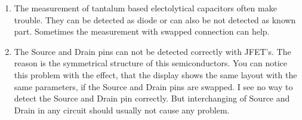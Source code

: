 \begin{enumerate}
\item The measurement of tantalum based electolytical capacitors often make trouble.
They can be detected as diode or can also be not detected as known part.
Sometimes the measurement with swapped connection can help.

\item The Source and Drain pins can not be detected correctly with JFET's.
The reason is the symmetrical structure of this semiconductors.
You can notice this problem with the effect, that the display shows the same layout with the same parameters,
if the Source and Drain pins are swapped.
I see no way to detect the Source and Drain pin correctly.
But interchanging of Source and Drain in any circuit should usually not cause any problem.

\end{enumerate}
